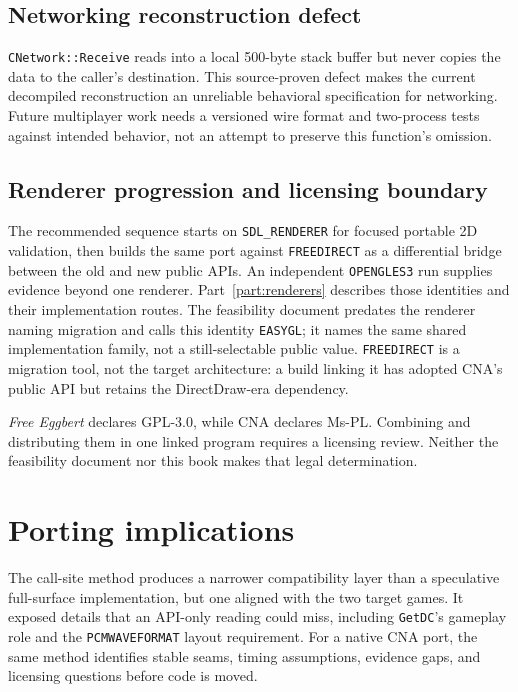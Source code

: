 \subsection{Networking reconstruction defect}

\texttt{CNetwork::Receive} reads into a local 500-byte stack buffer but never copies the data to
the caller's destination. This source-proven defect makes the current decompiled reconstruction
an unreliable behavioral specification for networking. Future multiplayer work needs a
versioned wire format and two-process tests against intended behavior, not an attempt to preserve
this function's omission.

\subsection{Renderer progression and licensing boundary}

The recommended sequence starts on \texttt{SDL\_RENDERER} for focused portable 2D validation,
then builds the same port against \texttt{FREEDIRECT} as a differential bridge between the old
and new public APIs. An independent \texttt{OPENGLES3} run supplies evidence beyond one renderer.
Part~\ref{part:renderers} describes those identities and their implementation routes. The
feasibility document predates the renderer naming migration and calls this identity
\texttt{EASYGL}; it names the same shared implementation family, not a still-selectable public
value. \texttt{FREEDIRECT} is a migration tool, not the target architecture: a build linking it
has adopted CNA's public API but retains the DirectDraw-era dependency.

\emph{Free Eggbert} declares GPL-3.0, while CNA declares Ms-PL. Combining and distributing them
in one linked program requires a licensing review. Neither the feasibility document nor this
book makes that legal determination.

\section{Porting implications}

The call-site method produces a narrower compatibility layer than a speculative full-surface
implementation, but one aligned with the two target games. It exposed details that an API-only
reading could miss, including \texttt{GetDC}'s gameplay role and the
\texttt{PCMWAVEFORMAT} layout requirement. For a native CNA port, the same method identifies
stable seams, timing assumptions, evidence gaps, and licensing questions before code is moved.
